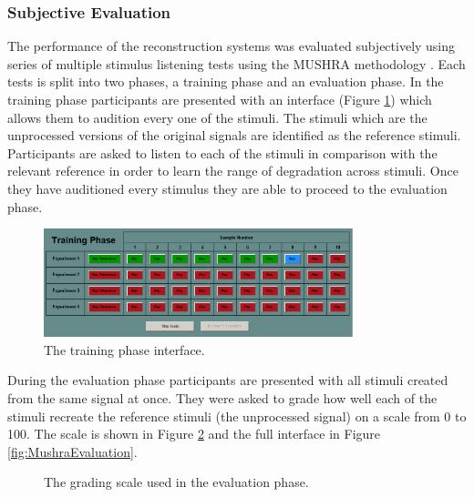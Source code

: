 		\subsubsection*{Subjective Evaluation}
			The performance of the reconstruction systems was evaluated subjectively using series of multiple
			stimulus listening tests using the MUSHRA methodology \citep{mushra2014}. Each tests is split into
			two phases, a training phase and an evaluation phase. In the training phase participants are
			presented with an interface (Figure \ref{fig:MushraTraining}) which allows them to audition every
			one of the stimuli. The stimuli which are the unprocessed versions of the original signals are
			identified as the reference stimuli. Participants are asked to listen to each of the stimuli in
			comparison with the relevant reference in order to learn the range of degradation across stimuli.
			Once they have auditioned every stimulus they are able to proceed to the evaluation phase.

			\begin{figure}[h!]
				\centering
				\includegraphics[width=0.8\textwidth]{chapter7/Images/MushraTraining.png}
				\caption{The training phase interface.}
				\label{fig:MushraTraining}
			\end{figure}

			During the evaluation phase participants are presented with all stimuli created from the same
			signal at once. They were asked to grade how well each of the stimuli recreate the reference
			stimuli (the unprocessed signal) on a scale from 0 to 100. The scale is shown in Figure
			\ref{fig:MushraScale} and the full interface in Figure \ref{fig:MushraEvaluation}.

			\begin{figure}[h!]
				\centering
				\caption{The grading scale used in the evaluation phase.}
				\label{fig:MushraScale}
			\end{figure}

